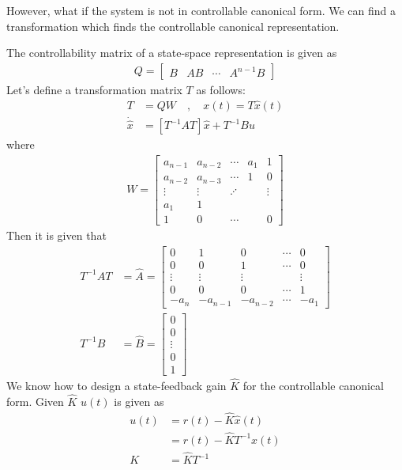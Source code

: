\documentclass[twoside]{article}
\begin{document}
However, what if the system is not in controllable canonical form. We can
find a transformation which finds the controllable canonical
representation. 

The controllability matrix of a state-space representation is given as
%
\begin{align*}
  Q = \left[ \begin{array}{c|c|c|c} B & A B & \cdots & A^{n-1} B\end{array} \right]
\end{align*}
%
Let's define a transformation matrix $T$ as follows:
%
\begin{align*}
  T &= Q W \quad , \quad x(t) = T \hat{x}(t)
\\
 \dot{\hat{x}} &= \left[ T^{-1} A T \right] \hat{x} + T^{-1} B u
\end{align*}
%
where
%
\begin{align*}
  W = \left[ \begin{array}{ccccc} a_{n-1} & a_{n-2} & \cdots & a_1 & 1
               \\ 
a_{n-2} & a_{n-3} & \cdots & 1 & 0
\\ \vdots & \vdots & \iddots & & \vdots
\\ a_1 & 1 &  & & 
    \\ 1 & 0 & \cdots &  & 0 \end{array} \right] 
\end{align*}
%
Then it is given that
%
\begin{align*}
  T^{-1} A T &= \hat{A} =  \left[ \begin{array}{ccccc} 0 & 1 & 0 & \cdots & 0 \\ 0 & 0 & 1 &
                                                                      \cdots & 0
\\ \vdots & \vdots & \vdots & & \vdots
\\ 0 & 0 & 0 & \cdots & 1
    \\ -a_n & -a_{n-1} & -a_{n-2} & \cdots & -a_1 \end{array} \right]
\\
  T^{-1} B &= \hat{B} = \left[ \begin{array}{c} 0\\ 0 \\ \vdots \\ 0
    \\ 1 \end{array} \right]
\end{align*}
%
We know how to design a
state-feedback gain $\hat{K}$ for the controllable
canonical form. Given $\hat{K}$ 
$u(t)$ is given as
%
\begin{align*}
  u(t) &= r(t) -\hat{K} \hat{x}(t)
\\ 
&= r(t) - \hat{K} T^{-1} x(t)
\\
K &= \hat{K} T^{-1}
\end{align*}
\end{document}
